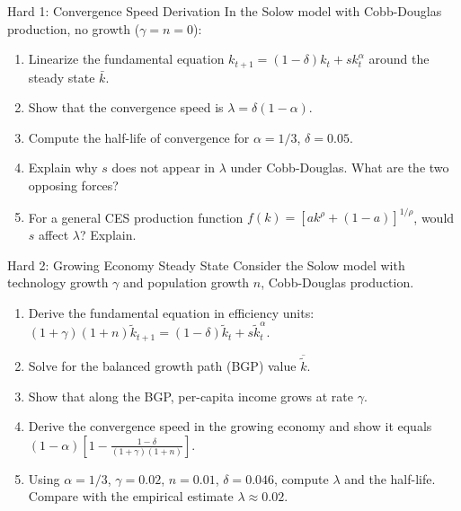 \documentclass[aspectratio=169,10pt]{beamer}
\newcommand{\apxbutton}[1]{\hfill\hyperlink{#1}{\beamerbutton{Solution}}}
\begin{document}
\begin{frame}{Hard 1: Convergence Speed Derivation}
\hypertarget{q-h1}{}
In the Solow model with Cobb-Douglas production, no growth ($\gamma=n=0$):

\begin{enumerate}
  \item Linearize the fundamental equation $k_{t+1} = (1-\delta)k_t + sk_t^\alpha$ around the steady state $\bar{k}$.
  \item Show that the convergence speed is $\lambda = \delta(1-\alpha)$.
  \item Compute the half-life of convergence for $\alpha=1/3$, $\delta=0.05$.
  \item Explain why $s$ does not appear in $\lambda$ under Cobb-Douglas. What are the two opposing forces?
  \item For a general CES production function $f(k) = [ak^\rho + (1-a)]^{1/\rho}$, would $s$ affect $\lambda$? Explain.
\end{enumerate}
\apxbutton{s-h1}
\end{frame}

\begin{frame}{Hard 2: Growing Economy Steady State}
\hypertarget{q-h2}{}
Consider the Solow model with technology growth $\gamma$ and population growth $n$, Cobb-Douglas production.

\begin{enumerate}
  \item Derive the fundamental equation in efficiency units: $(1+\gamma)(1+n)\tilde{k}_{t+1} = (1-\delta)\tilde{k}_t + s\tilde{k}_t^\alpha$.
  \item Solve for the balanced growth path (BGP) value $\overline{\tilde{k}}$.
  \item Show that along the BGP, per-capita income grows at rate $\gamma$.
  \item Derive the convergence speed in the growing economy and show it equals $(1-\alpha)\left[1 - \frac{1-\delta}{(1+\gamma)(1+n)}\right]$.
  \item Using $\alpha=1/3$, $\gamma=0.02$, $n=0.01$, $\delta=0.046$, compute $\lambda$ and the half-life. Compare with the empirical estimate $\lambda \approx 0.02$.
\end{enumerate}
\apxbutton{s-h2}
\end{frame}
\end{document}
